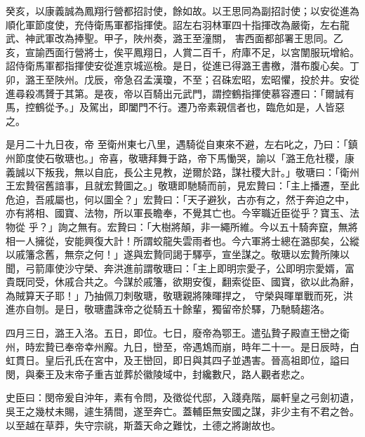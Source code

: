 \begin{pinyinscope}
 癸亥，以康義誠為鳳翔行營都招討使，餘如故。以王思同為副招討使；以安從進為順化軍節度使，充侍衛馬軍都指揮使。詔左右羽林軍四十指揮改為嚴衛，左右龍武、神武軍改為捧聖。甲子，陜州奏，潞王至潼關，
 害西面都部署王思同。乙亥，宣諭西面行營將士，俟平鳳翔日，人賞二百千，府庫不足，以宮闈服玩增給。詔侍衛馬軍都指揮使安從進京城巡檢。是日，從進已得潞王書檄，潛布腹心矣。丁卯，潞王至陜州。戊辰，帝急召孟漢瓊，不至；召硃宏昭，宏昭懼，投於井。安從進尋殺馮贇于其第。是夜，帝以百騎出元武門，謂控鶴指揮使慕容遷曰：「爾誠有馬，控鶴從予。」及駕出，即闔門不行。遷乃帝素親信者也，臨危如是，人皆惡之。



 是月二十九日夜，帝
 至衛州東七八里，遇騎從自東來不避，左右叱之，乃曰：「鎮州節度使石敬瑭也。」帝喜，敬瑭拜舞于路，帝下馬慟哭，諭以「潞王危社稷，康義誠以下叛我，無以自庇，長公主見教，逆爾於路，謀社稷大計。」敬瑭曰：「衛州王宏贄宿舊諳事，且就宏贄圖之。」敬瑭即馳騎而前，見宏贄曰：「主上播遷，至此危迫，吾戚屬也，何以圖全？」宏贄曰：「天子避狄，古亦有之，然于奔迫之中，亦有將相、國寶、法物，所以軍長瞻奉，不覺其亡也。今宰職近臣從乎？寶玉、法物從
 乎？」詢之無有。宏贄曰：「大樹將顛，非一繩所維。今以五十騎奔竄，無將相一人擁從，安能興復大計！所謂蛟龍失雲雨者也。今六軍將士總在潞邸矣，公縱以戚籓念舊，無奈之何！」遂與宏贄同謁于驛亭，宣坐謀之。敬瑭以宏贄所陳以聞，弓箭庫使沙守榮、奔洪進前謂敬瑭曰：「主上即明宗愛子，公即明宗愛婿，富貴既同受，休戚合共之。今謀於戚籓，欲期安復，翻索從臣、國寶，欲以此為辭，為賊算天子耶！」乃抽佩刀刺敬瑭，敬瑭親將陳暉捍之，
 守榮與暉單戰而死，洪進亦自刎。是日，敬瑭盡誅帝之從騎五十餘輩，獨留帝於驛，乃馳騎趨洛。



 四月三日，潞王入洛。五日，即位。七日，廢帝為鄂王。遣弘贄子殿直王巒之衛州，時宏贄已奉帝幸州廨。九日，巒至，帝遇鴆而崩，時年二十一。是日辰時，白虹貫日。皇后孔氏在宮中，及王巒回，即日與其四子並遇害。晉高祖即位，謚曰閔，與秦王及末帝子重吉並葬於徽陵域中，封纔數尺，路人觀者悲之。



 史臣曰：閔帝爰自沖年，素有令問，及徵從代邸，入踐堯階，屬軒皇之弓劍初遺，吳王之幾杖未賜，遽生猜間，遂至奔亡。蓋輔臣無安國之謀，非少主有不君之咎。以至越在草莽，失守宗祧，斯蓋天命之難忱，土德之將謝故也。



\end{pinyinscope}